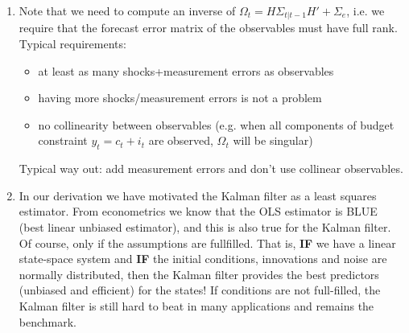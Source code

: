 \begin{enumerate}
	\item Note that we need to compute an inverse of $\Omega_t = H\Sigma_{t|t-1}H' + \Sigma_e$, i.e. we require that the forecast error matrix of the observables must have full rank. Typical requirements:
		\begin{itemize}
			\item at least as many shocks+measurement errors as observables	
			\item having more shocks\slash measurement errors is not a problem	
			\item no collinearity between observables (e.g. when all components of budget constraint $y_t=c_t+i_t$ are observed, $\Omega_t$ will be singular)	
		\end{itemize}
		Typical way out: add measurement errors and don't use collinear observables.
	\item In our derivation we have motivated the Kalman filter as a least squares estimator. From econometrics we know that the OLS estimator is BLUE (best linear unbiased estimator), and this is also true for the Kalman filter. Of course, only if the assumptions are fullfilled. That is, \textbf{IF} we have a linear state-space system and \textbf{IF} the initial conditions, innovations and noise are normally distributed, then the Kalman filter provides the best predictors (unbiased and efficient) for the states! If conditions are not full-filled, the Kalman filter is still hard to beat in many applications and remains the benchmark.
\end{enumerate}